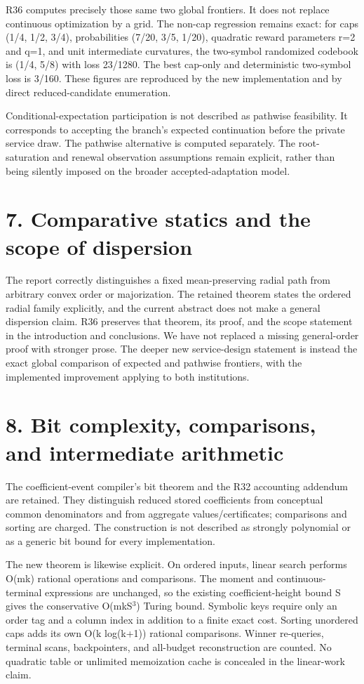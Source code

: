 \documentclass[11pt,letterpaper]{article}
\begin{document}
R36 computes precisely those same two global frontiers. It does not replace continuous optimization by a grid. The non-cap regression remains exact: for caps (1/4, 1/2, 3/4), probabilities (7/20, 3/5, 1/20), quadratic reward parameters r=2 and q=1, and unit intermediate curvatures, the two-symbol randomized codebook is (1/4, 5/8) with loss 23/1280. The best cap-only and deterministic two-symbol loss is 3/160. These figures are reproduced by the new implementation and by direct reduced-candidate enumeration.


Conditional-expectation participation is not described as pathwise feasibility. It corresponds to accepting the branch's expected continuation before the private service draw. The pathwise alternative is computed separately. The root-saturation and renewal observation assumptions remain explicit, rather than being silently imposed on the broader accepted-adaptation model.


\section*{7. Comparative statics and the scope of dispersion}

The report correctly distinguishes a fixed mean-preserving radial path from arbitrary convex order or majorization. The retained theorem states the ordered radial family explicitly, and the current abstract does not make a general dispersion claim. R36 preserves that theorem, its proof, and the scope statement in the introduction and conclusions. We have not replaced a missing general-order proof with stronger prose. The deeper new service-design statement is instead the exact global comparison of expected and pathwise frontiers, with the implemented improvement applying to both institutions.


\section*{8. Bit complexity, comparisons, and intermediate arithmetic}

The coefficient-event compiler's bit theorem and the R32 accounting addendum are retained. They distinguish reduced stored coefficients from conceptual common denominators and from aggregate values/certificates; comparisons and sorting are charged. The construction is not described as strongly polynomial or as a generic bit bound for every implementation.


The new theorem is likewise explicit. On ordered inputs, linear search performs O(mk) rational operations and comparisons. The moment and continuous-terminal expressions are unchanged, so the existing coefficient-height bound S gives the conservative O(mkS$^3$) Turing bound. Symbolic keys require only an order tag and a column index in addition to a finite exact cost. Sorting unordered caps adds its own O(k log(k+1)) rational comparisons. Winner re-queries, terminal scans, backpointers, and all-budget reconstruction are counted. No quadratic table or unlimited memoization cache is concealed in the linear-work claim.
\end{document}
